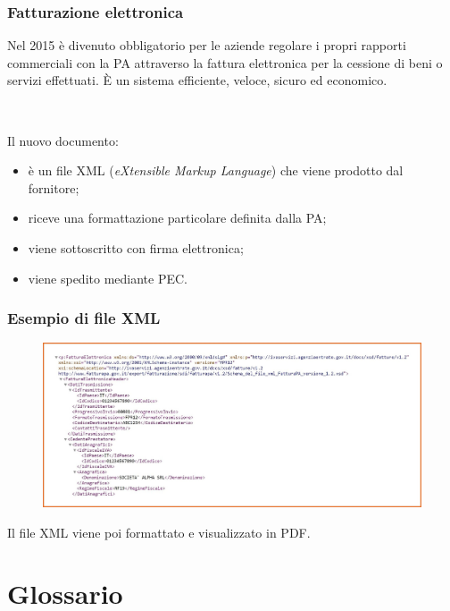\documentclass[]{beamer}
\begin{document}
\begin{frame}
\frametitle{Fatturazione elettronica}
Nel 2015 è divenuto obbligatorio per le aziende regolare i propri rapporti commerciali con la PA attraverso la fattura elettronica per la cessione di beni o servizi effettuati. È un sistema efficiente, veloce, sicuro ed economico.\pause

~

Il nuovo documento:
\begin{itemize}
  \item è un file XML (\emph{eXtensible Markup Language}) che viene prodotto dal fornitore;\pause
  \item riceve una formattazione particolare definita dalla PA;\pause
  \item viene sottoscritto con firma elettronica;\pause
  \item viene spedito mediante PEC.
\end{itemize}
\end{frame}

\begin{frame}
\frametitle{Esempio di file XML}
\begin{figure}
  \includegraphics[width=\columnwidth]{img/xmlfattura.jpg}
\end{figure}
Il file XML viene poi formattato e visualizzato in PDF.
\begin{center}
  \href{https://www.fatturapa.gov.it/it/lafatturapa/esempi/}{}
\end{center}
\end{frame}

\section{Glossario}
\end{document}
